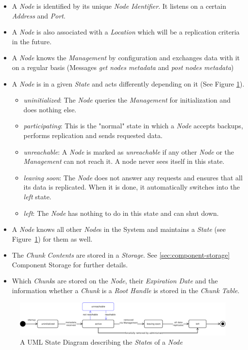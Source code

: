 \begin{itemize}
    \item A \emph{Node} is identified by its unique \emph{Node Identifier}. It listens on a certain \emph{Address} and \emph{Port}.
    \item A \emph{Node} is also associated with a \emph{Location} which will be a replication criteria in the future.
    \item A \emph{Node} knows the \emph{Management} by configuration and exchanges data with it on a regular basis (Messages \emph{get nodes metadata} and \emph{post nodes metadata})
    \item A \emph{Node} is in a given \emph{State} and acts differently depending on it (See Figure \ref{fig:node-states}).
    \begin{itemize}
        \item \emph{uninitialized}: The \emph{Node} queries the \emph{Management} for initialization and does nothing else.
        \item \emph{participating}: This is the "normal" state in which a \emph{Node} accepts backups, performs replication and sends requested data.
        \item \emph{unreachable}: A \emph{Node} is marked as \emph{unreachable} if any other \emph{Node} or the \emph{Management} can not reach it. A node never sees itself in this state.
        \item  \emph{leaving soon}: The \emph{Node} does not answer any requests and ensures that all its data is replicated. When it is done, it automatically switches into the \emph{left} state.
        \item \emph{left}: The \emph{Node} has nothing to do in this state and can shut down.
    \end{itemize}
    \item A \emph{Node} knows all other \emph{Node}s in the System and maintains a \emph{State} (see Figure~\ref{fig:node-states}) for them as well.
    \item The \emph{Chunk Contents} are stored in a \emph{Storage}. See \ref{sec:component-storage} Component Storage for further details.
    \item Which \emph{Chunk}s are stored on the \emph{Node}, their \emph{Expiration Date} and the information whether a \emph{Chunk} is a \emph{Root Handle} is stored in the \emph{Chunk Table}.
\end{itemize}

\begin{figure}[h]
    \centering
    \includegraphics[width=1\linewidth]{resources/node_state}
    \caption[Node States]{A UML State Diagram describing the \emph{State}s of a \emph{Node}}
    \label{fig:node-states}
\end{figure}

